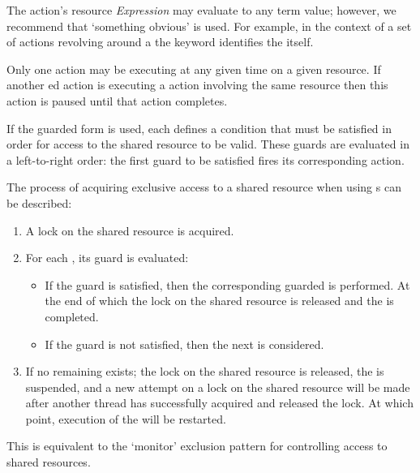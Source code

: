 The  action's resource \emph{Expression} may evaluate to any term value; however, we recommend that `something obvious' is used. For example, in the context of a set of actions revolving around a  the  keyword identifies the  itself.

Only one  action may be executing at any given time on a given resource. If another ed action is executing a  action involving the same resource then this action is paused until that action completes.

If the guarded form is used, each  defines a condition that must be satisfied in order for access to the shared resource to be valid. These guards are evaluated in a left-to-right order: the first guard to be satisfied fires its corresponding action.

The process of acquiring exclusive access to a shared resource when using s can be described:
\begin{enumerate}
\item A lock on the shared resource is acquired.
\item For each , its guard  is evaluated:
\begin{itemize}
\item  If the guard is satisfied, then the corresponding guarded  is performed. At the end of which the lock on the shared resource is released and the  is completed.
\item If the guard is not satisfied, then the next  is considered.
\end{itemize}
\item If no remaining  exists; the lock on the shared resource is released, the  is suspended, and a new attempt on a lock on the shared resource will be made after another thread has successfully acquired and released the lock. At which point, execution of the  will be restarted.
\end{enumerate}

\begin{aside}
This is equivalent to the `monitor' exclusion pattern for controlling access to shared resources.
\end{aside}

